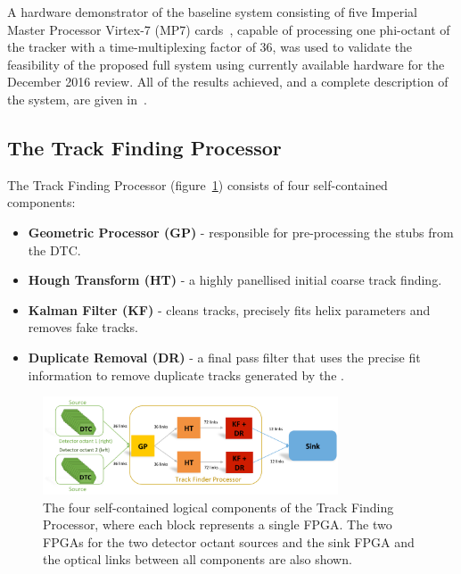 A hardware demonstrator of the baseline system consisting of five Imperial Master Processor Virtex-7 (MP7) cards~\cite{mp7ref}, capable of processing one phi-octant of the tracker with a time-multiplexing factor of 36, was used to validate the feasibility of the proposed full system using currently available hardware for the December 2016 review.
All of the results achieved, and a complete description of the system, are given in~\cite{TMTT_JINST}.

\subsection{The Track Finding Processor}\label{subsec:TFP}
The Track Finding Processor (figure~\ref{fig:TFP}) consists of four self-contained components:
\begin{itemize}
\item {\bf Geometric Processor (GP)} - responsible for pre-processing the stubs from the DTC.
\item {\bf Hough Transform (HT)} - a highly panellised initial coarse track finding.
\item {\bf Kalman Filter (KF)} - cleans tracks, precisely fits helix parameters and removes fake tracks.
\item {\bf Duplicate Removal (DR)} - a final pass filter that uses the precise fit information to remove duplicate tracks generated by the \HT.
\end{itemize}

\begin{figure}[!h]
\centering
\includegraphics[width=0.78\textwidth]{figs/tk-upgrade/demoslice1.pdf}
\caption{The four self-contained logical components of the Track Finding Processor, where each block represents a single FPGA. The two FPGAs for the two detector octant sources and the sink FPGA and the optical links between all components are also shown.}
\label{fig:TFP}
\end{figure}

